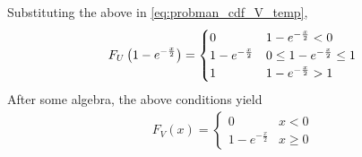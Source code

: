 \begin{enumerate}
%
Substituting the above in \eqref{eq:probman_cdf_V_temp},
%
\begin{align}
F_U\left(1- e^{-\frac{x}{2}}\right) =
\begin{cases}
0 &  1- e^{-\frac{x}{2}} < 0 \\
1- e^{-\frac{x}{2}} & 0 \le 1- e^{-\frac{x}{2}} \le 1 \\
1 & 1- e^{-\frac{x}{2}} > 1
\end{cases}
\end{align}
After some algebra, the above conditions yield
\begin{align}
F_V(x) = 
\begin{cases}
0 & x < 0 \\
1- e^{-\frac{x}{2}} & x \ge 0
\end{cases}
\label{eq:probman_V_cdf_anal}
\end{align}
\end{enumerate}


